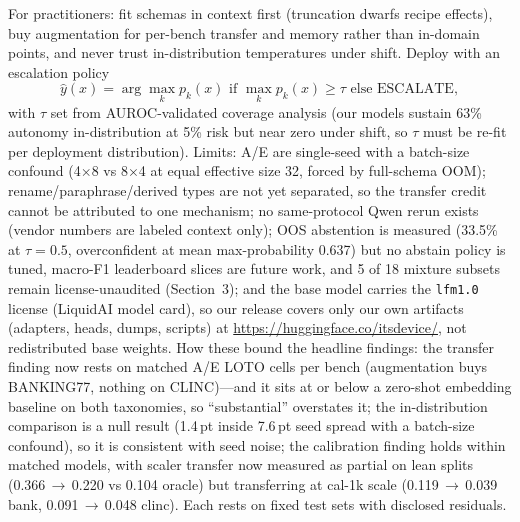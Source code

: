 For practitioners: fit schemas
in context first (truncation dwarfs recipe effects), buy augmentation for
per-bench transfer and memory rather than in-domain
points, and never trust in-distribution temperatures under shift. Deploy with
an escalation policy
\begin{equation}
\hat{y}(x) = \arg\max_k p_k(x) \text{ if } \max_k p_k(x)\ge\tau
\text{ else ESCALATE},
\end{equation}
with $\tau$ set from AUROC-validated coverage analysis (our models sustain 63\%
autonomy in-distribution at 5\% risk but near zero under shift, so $\tau$ must
be re-fit per deployment distribution). Limits: A/E are single-seed
with a batch-size confound (4$\times$8 vs 8$\times$4 at equal effective size 32,
forced by full-schema OOM); rename/paraphrase/derived types are not yet
separated, so the transfer credit cannot be attributed to one mechanism; no
same-protocol Qwen rerun exists (vendor numbers are labeled context only);
OOS abstention is measured (33.5\% at $\tau{=}0.5$, overconfident at mean
max-probability 0.637) but no abstain policy is tuned,
macro-F1 leaderboard slices are future work, and 5 of 18 mixture subsets
remain license-unaudited (Section~3); and the base model carries the
\texttt{lfm1.0} license (LiquidAI model card), so our release covers only our
own artifacts (adapters, heads, dumps, scripts) at
\url{https://huggingface.co/itsdevice/}, not redistributed base weights. How these bound the headline findings: the transfer finding now rests
on matched A/E LOTO cells per bench (augmentation buys BANKING77, nothing on
CLINC)---and it
sits at or below a zero-shot embedding baseline on both taxonomies, so
``substantial'' overstates it; the
in-distribution comparison is a null result (1.4\,pt inside 7.6\,pt seed
spread with a batch-size confound), so it
is consistent with seed noise; the calibration finding holds within matched
models, with scaler transfer now measured as partial on lean splits
(0.366\,$\to$\,0.220 vs
0.104 oracle) but transferring at cal-1k scale (0.119\,$\to$\,0.039 bank,
0.091\,$\to$\,0.048 clinc). Each rests
on fixed test sets with disclosed residuals.
